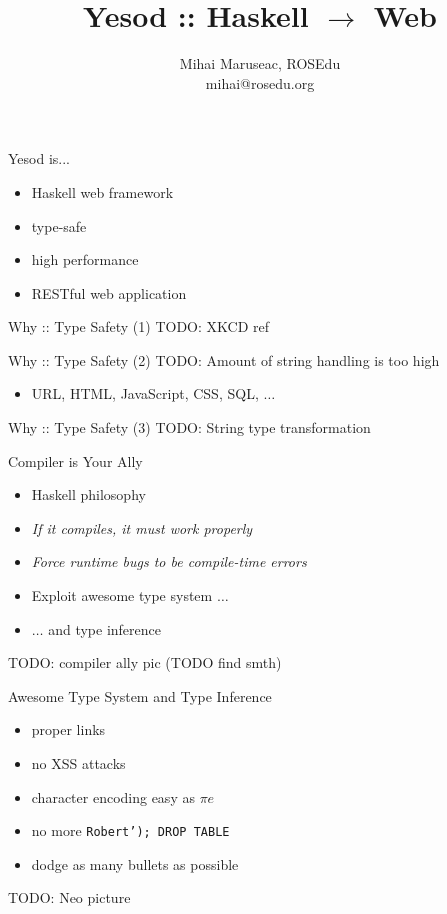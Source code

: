 \documentclass{beamer}
\title{Yesod :: Haskell $\rightarrow$ Web}
\author{Mihai Maruseac, ROSEdu\\mihai@rosedu.org}
\begin{document}
\maketitle

\begin{frame}{Yesod is...}
  \begin{itemize}[<+->]
    \item Haskell web framework
    \item type-safe
    \item high performance
    \item RESTful web application
  \end{itemize}
  \vspace{-3cm}
  \hspace{6cm}
\end{frame}

\begin{frame}{Why :: Type Safety (1)}
  TODO: XKCD ref
\end{frame}

\begin{frame}{Why :: Type Safety (2)}
  TODO: Amount of string handling is too high
  \begin{itemize}
    \item URL, HTML, JavaScript, CSS, SQL, $\ldots$
  \end{itemize}
\end{frame}

\begin{frame}{Why :: Type Safety (3)}
  TODO: String type transformation
\end{frame}

\begin{frame}{Compiler is Your Ally}
  \begin{itemize}[<+->]
    \item Haskell philosophy
    \item \textit{If it compiles, it must work properly}
    \item \textit{Force runtime bugs to be compile-time errors}
    \item Exploit awesome type system $\ldots$
    \item $\ldots$ and type inference
  \end{itemize}
  TODO: compiler ally pic (TODO find smth)
\end{frame}

\begin{frame}{Awesome Type System and Type Inference}
  \begin{itemize}[<+->]
    \item proper links
    \item no XSS attacks
    \item character encoding easy as $\pi e$
    \item no more \texttt{Robert'); DROP TABLE}
    \item dodge as many bullets as possible
  \end{itemize}
  TODO: Neo picture
\end{frame}
\end{document}
